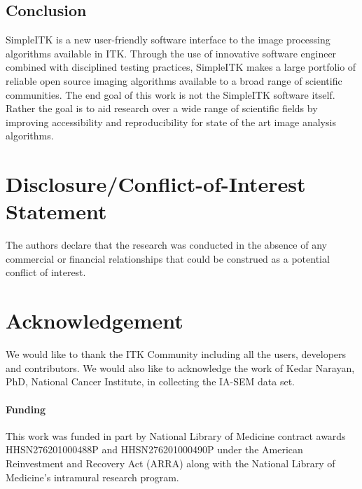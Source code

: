 \documentclass{frontiersMED} %
\begin{document}
\subsection{Conclusion}
SimpleITK is a new user-friendly software interface to the image
processing algorithms available in ITK. Through the use of innovative
software engineer combined with disciplined testing practices,
SimpleITK makes a large portfolio of reliable open source imaging
algorithms available to a broad range of scientific communities. The
end goal of this work is not the SimpleITK software itself. Rather the
goal is to aid research over a wide range of scientific fields by
improving accessibility and reproducibility for state of the art image
analysis algorithms.

\section*{Disclosure/Conflict-of-Interest Statement}
The authors declare that the research was conducted in the absence of any commercial or financial relationships that could be construed as a potential conflict of interest.

\section*{Acknowledgement}

We would like to thank the ITK Community including all the users,
developers and contributors. We would also like to acknowledge the
work of Kedar Narayan, PhD, National Cancer Institute,  in collecting
the IA-SEM data set.

\paragraph{Funding\textcolon}

This work was funded in part by National Library of Medicine contract
awards HHSN276201000488P and HHSN276201000490P under the American
Reinvestment and Recovery Act (ARRA) along with the National Library
of Medicine's intramural research program.
\end{document}
